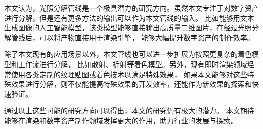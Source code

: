 本文认为，光照分解管线是一个极具潜力的研究方向。虽然本文专注于对数字资产进行分解，但是还有更多方法的输出可以作为本文管线的输入。
比如能够用文本生成图像的人工智能模型，该类模型能够直接输出高质量二维图片，在经过光照分解管线后，可以将产物直接用于渲染引擎，
能够大幅提升数字资产的制作效率。

除了本文现有的应用场景以外，本文管线也可以进一步扩展为按照更复杂的着色模型和工作流进行分解，
比如散射、折射等着色模型。另外，现有即时渲染领域经常使用各类定制的纹理贴图或着色技术以满足特殊效果，
如果本文能够对这些特殊效果进行分解，则不仅能提高特殊效果的开发效率，还能作为新效果的探索和快速验证。

通过以上这些可能的研究方向可以得出，本文的研究仍有极大的潜力。
本文期待能够在渲染和数字资产制作领域发挥更大的作用，助力行业的发展与探索。
